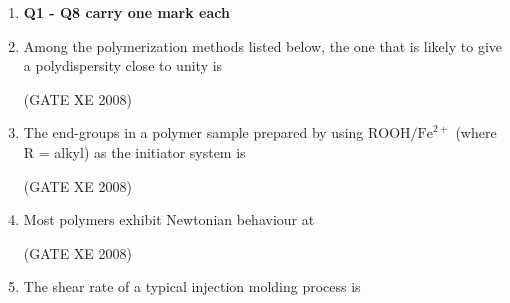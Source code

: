 \documentclass[12pt]{article}
\begin{document}
\begin{enumerate}
\item[] \textbf{Q1 - Q8 carry one mark each}

\item Among the polymerization methods listed below, the one that is likely to give a polydispersity close to unity is  

\begin{enumerate}
\end{enumerate}

 (GATE XE 2008)

\item The end-groups in a polymer sample prepared by using $\mathrm{ROOH}/\mathrm{Fe}^{2+}$ (where R = alkyl) as the initiator system is  

\begin{enumerate}
\end{enumerate}

 (GATE XE 2008)

\item Most polymers exhibit Newtonian behaviour at  

\begin{enumerate}
\end{enumerate}

(GATE XE 2008)

\item The shear rate of a typical injection molding process is  


\end{enumerate}
\end{document}
